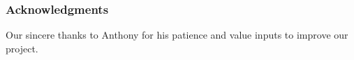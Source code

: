 \documentclass{article} %
\begin{document}



\subsubsection*{Acknowledgments}

Our sincere thanks to Anthony for his patience and value inputs to improve our project.


\end{document}
